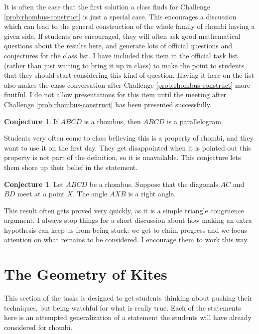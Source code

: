 \documentclass{tufte-handout}
\theoremstyle{definition}
\newtheorem{conjecture}[problem]{Conjecture}
\begin{document}
It is often the case that the first solution a class finds for Challenge \ref{prob:rhombus-construct} is just a special case.
This encourages a discussion which can lead to the general construction of the whole family of rhombi having a given side.
If students are encouraged, they will often ask good mathematical questions about the results here, and generate lots of official questions and conjectures for the class list. I have included this item in the official task list (rather than just waiting to bring it up in class) to make the point to students that they should start considering this kind of question. Having it here on the list also makes the class conversation after Challenge \ref{prob:rhombus-construct} more fruitful. I do not allow presentations for this item until the meeting after Challenge \ref{prob:rhombus-construct} has been presented successfully.

\begin{conjecture}
\label{conj:rhombus-is-parallelogram}
If $ABCD$ is a rhombus, then $ABCD$ is a parallelogram.
\end{conjecture}

Students very often come to class believing this is a property of rhombi, and they want to use it on the first day.
They get disappointed when it is pointed out this property is not part of the definition, so it is unavailable.
This conjecture lets them shore up their belief in the statement.

\begin{conjecture}
\label{conj:rhombus-diagonals-angle}
Let $ABCD$ be a rhombus. Suppose that the diagonals $AC$ and $BD$ meet at a point $X$.
The angle $AXB$ is a right angle.
\end{conjecture}

This result often gets proved very quickly, as it is a simple triangle congruence argument. I always stop things for a short discussion about how making an extra hypothesis can keep us from being stuck: we get to claim progress and we focus attention on what remains to be considered. I encourage them to work this way.

\clearpage
\setcounter{section}{2}
\setcounter{problem}{0}
\section{The Geometry of Kites}

This section of the tasks is designed to get students thinking about pushing their techniques, but being watchful for what is really true. Each of the statements here is an attempted generalization of a statement the students will have already considered for rhombi. 
\end{document}
